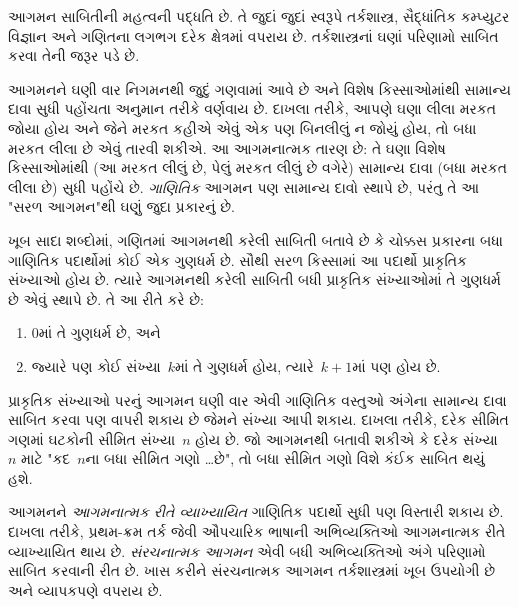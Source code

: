 \label{guunit:OLP-0614}


આગમન સાબિતીની મહત્વની પદ્ધતિ છે. તે જુદાં જુદાં સ્વરૂપે
તર્કશાસ્ત્ર, સૈદ્ધાંતિક કમ્પ્યુટર વિજ્ઞાન અને ગણિતના લગભગ દરેક
ક્ષેત્રમાં વપરાય છે. તર્કશાસ્ત્રનાં ઘણાં પરિણામો સાબિત કરવા તેની
જરૂર પડે છે.

આગમનને ઘણી વાર નિગમનથી જુદું ગણવામાં આવે છે અને વિશેષ કિસ્સાઓમાંથી
સામાન્ય દાવા સુધી પહોંચતા અનુમાન તરીકે વર્ણવાય છે. દાખલા તરીકે,
આપણે ઘણા લીલા મરકત જોયા હોય અને જેને મરકત કહીએ એવું એક પણ
બિનલીલું ન જોયું હોય, તો બધા મરકત લીલા છે એવું તારવી શકીએ. આ
આગમનાત્મક તારણ છે: તે ઘણા વિશેષ કિસ્સાઓમાંથી (આ મરકત લીલું છે,
પેલું મરકત લીલું છે વગેરે) સામાન્ય દાવા (બધા મરકત લીલા છે) સુધી
પહોંચે છે. \emph{ગાણિતિક} આગમન પણ સામાન્ય દાવો સ્થાપે છે, પરંતુ
તે આ "સરળ આગમન"થી ઘણું જુદા પ્રકારનું છે.

ખૂબ સાદા શબ્દોમાં, ગણિતમાં આગમનથી કરેલી સાબિતી બતાવે છે કે
ચોક્કસ પ્રકારના બધા ગાણિતિક પદાર્થોમાં કોઈ એક ગુણધર્મ છે. સૌથી
સરળ કિસ્સામાં આ પદાર્થો પ્રાકૃતિક સંખ્યાઓ હોય છે. ત્યારે
આગમનથી કરેલી સાબિતી બધી પ્રાકૃતિક સંખ્યાઓમાં તે ગુણધર્મ છે
એવું સ્થાપે છે. તે આ રીતે કરે છે:
\begin{enumerate}
    \item $0$માં તે ગુણધર્મ છે, અને
    \item જ્યારે પણ કોઈ સંખ્યા~$k$માં તે ગુણધર્મ હોય, ત્યારે~$k+1$માં પણ હોય છે.
\end{enumerate}
પ્રાકૃતિક સંખ્યાઓ પરનું આગમન ઘણી વાર એવી ગાણિતિક વસ્તુઓ અંગેના
સામાન્ય દાવા સાબિત કરવા પણ વાપરી શકાય છે જેમને સંખ્યા આપી શકાય.
દાખલા તરીકે, દરેક સીમિત ગણમાં ઘટકોની સીમિત સંખ્યા~$n$ હોય છે.
જો આગમનથી બતાવી શકીએ કે દરેક સંખ્યા~$n$ માટે "કદ~$n$ના બધા
સીમિત ગણો \dots છે", તો બધા સીમિત ગણો વિશે કંઈક સાબિત થયું હશે.

આગમનને \emph{આગમનાત્મક રીતે વ્યાખ્યાયિત} ગાણિતિક પદાર્થો સુધી
પણ વિસ્તારી શકાય છે. દાખલા તરીકે, પ્રથમ-ક્રમ તર્ક જેવી
ઔપચારિક ભાષાની અભિવ્યક્તિઓ આગમનાત્મક રીતે વ્યાખ્યાયિત
થાય છે. \emph{સંરચનાત્મક આગમન} એવી બધી અભિવ્યક્તિઓ અંગે
પરિણામો સાબિત કરવાની રીત છે. ખાસ કરીને સંરચનાત્મક આગમન
તર્કશાસ્ત્રમાં ખૂબ ઉપયોગી છે અને વ્યાપકપણે વપરાય છે.
\endgroup


\begingroup
\makeatletter{}\makeatother


\label{guunit:OLP-0615}


